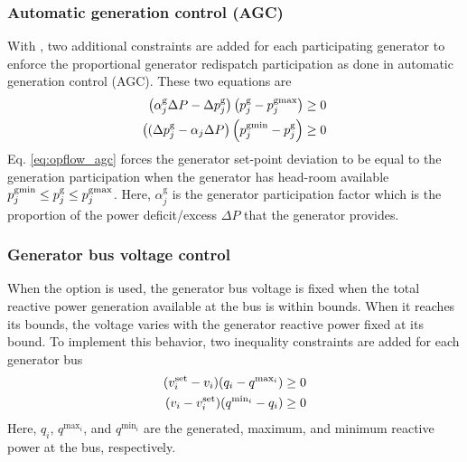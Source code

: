 \subsubsection{Automatic generation control (AGC)}
With \option{\opflowuseagc}, two additional constraints are added for each participating generator to enforce the proportional generator redispatch participation as done in automatic generation control (AGC). These two equations are 
\begin{equation}
\begin{aligned}
  \left(\alpha^{\text{g}}_j\Delta{P} - \Delta{p}^\text{g}_j\right)\left(p^\text{g}_j - p^\text{gmax}_j\right) \ge 0 \\
  \left((\Delta{p}^\text{g}_j - \alpha_j\Delta{P}\right)\left(p^\text{gmin}_j - p^\text{g}_j\right) \ge 0
\end{aligned}
\label{eq:opflow_agc}
\end{equation}
Eq. \ref{eq:opflow_agc} forces the generator set-point deviation to be equal to the generation participation when the generator has head-room available $p^\text{gmin}_j \le p^\text{g}_j \le p^\text{gmax}_j$. Here, $\alpha^{\text{g}}_j$ is the generator participation factor which is the proportion of the power deficit/excess $\Delta{P}$ that the generator provides.

\subsubsection{Generator bus voltage control}
When the option \opflowoption{\opflowgenbusvoltage~\fixedwithinqbounds} is used, the generator bus voltage is fixed when the total reactive power generation available at the bus is within bounds. When it reaches its bounds, the voltage varies with the generator reactive power fixed at its bound. To implement this behavior, two inequality constraints are added for each generator bus
\begin{equation}
\begin{aligned}
(v^{\text{set}}_i - v_i)(q_i - q^{\text{max}_i}) \ge 0 \\
(v_i - v^{\text{set}}_i)(q^{\text{min}_i} - q_i) \ge 0
\end{aligned}
\label{eq:opflow_genbusvoltage}
\end{equation}
Here, $q_i$, $q^{\text{max}_i}$, and $q^{\text{min}_i}$ are the generated, maximum, and minimum reactive power at the bus, respectively.

\begin{comment}
\subssubection{Voltage magnitude for cartesian coordinates}
When using cartesian coordinates for voltages, inequality constraints (\ref{eq:opflow_ineq_vmag}) need to introduced to constraining the voltage magnitude within its bounds
\begin{equation}
  {\vmini}^2 \le {\vreali}^2 + {\vimagi}^2 \le {\vmaxi}^2,~~\iinJbus
\label{eq:opflow_ineq_vmag}
\end{equation}
\end{comment}


